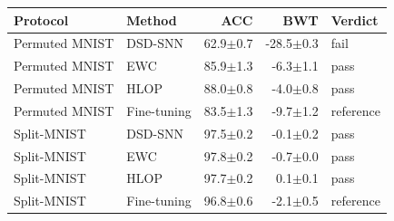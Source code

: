 \begin{tabular}{llrrl}
\toprule
Protocol & Method & ACC & BWT & Verdict \\
\midrule
Permuted MNIST & DSD-SNN & 62.9{\tiny$\pm$0.7} & -28.5{\tiny$\pm$0.3} & fail \\
Permuted MNIST & EWC & 85.9{\tiny$\pm$1.3} & -6.3{\tiny$\pm$1.1} & pass \\
Permuted MNIST & HLOP & 88.0{\tiny$\pm$0.8} & -4.0{\tiny$\pm$0.8} & pass \\
Permuted MNIST & Fine-tuning & 83.5{\tiny$\pm$1.3} & -9.7{\tiny$\pm$1.2} & reference \\
Split-MNIST & DSD-SNN & 97.5{\tiny$\pm$0.2} & -0.1{\tiny$\pm$0.2} & pass \\
Split-MNIST & EWC & 97.8{\tiny$\pm$0.2} & -0.7{\tiny$\pm$0.0} & pass \\
Split-MNIST & HLOP & 97.7{\tiny$\pm$0.2} & 0.1{\tiny$\pm$0.1} & pass \\
Split-MNIST & Fine-tuning & 96.8{\tiny$\pm$0.6} & -2.1{\tiny$\pm$0.5} & reference \\
\bottomrule
\end{tabular}
